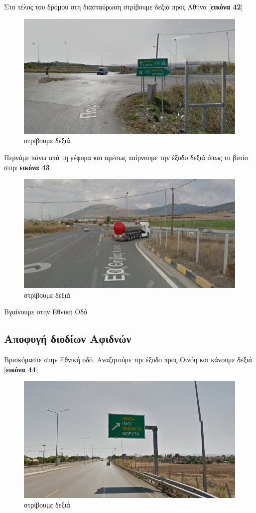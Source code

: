 Στο τέλος του δρόμου στη διασταύρωση στρίβουμε δεξιά προς Αθήνα [\textbf{εικόνα 42}]
\begin{figure}[H]
\includegraphics[width=\textwidth]{images/lamia-athina/thiva/thiva_018.jpg} 
\caption{στρίβουμε δεξιά}
\end{figure}
Περνάμε πάνω από τη γέφυρα και αμέσως παίρνουμε την έξοδο δεξιά όπως το βυτίο στην \textbf{εικόνα 43}
\begin{figure}[H]
\includegraphics[width=\textwidth]{images/lamia-athina/thiva/thiva_019.jpg} 
\caption{στρίβουμε δεξιά}
\end{figure}
Βγαίνουμε στην Εθνική Οδό
\newpage
\begin{center}
\section*{Αποφυγή διοδίων Αφιδνών}
\end{center}
Βρισκόμαστε στην Εθνική οδό. Αναζητούμε την έξοδο προς Οινόη και κάνουμε δεξιά [\textbf{εικόνα 44}]
\begin{figure}[H]
\includegraphics[width=\textwidth]{images/lamia-athina/afidnon/afidnon_020.jpg} 
\caption{στρίβουμε δεξιά}
\end{figure}
